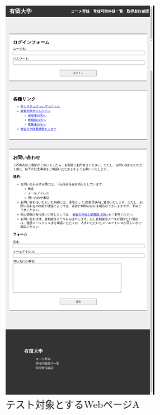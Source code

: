 \begin{figure}[htbp]
    \centering
    \includegraphics[width=0.5\textwidth]{image/5/original_png/bf_original.png}
    \caption{テスト対象とするWebページA}
    \label{fig:bf_original}
\end{figure}
